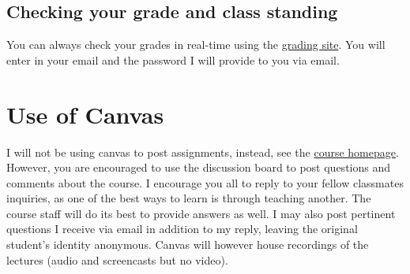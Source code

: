 \documentclass[12pt]{article}
\newcommand{\coursewebpage}{\href{https://github.com/kapelner/Wharton_Stat_422_722}{course homepage}}
\begin{document}
%
%
%
%

\subsection*{Checking your grade and class standing}

You can always check your grades in real-time using the \href{http://wharton.gradesly.com}{grading site}. You will enter in your email and the password I will provide to you via email.

\section*{Use of Canvas}
I will not be using canvas to post assignments, instead, see the \coursewebpage. However, you are encouraged to use the discussion board to post questions and comments about the course. I encourage you all to reply to your fellow classmates inquiries, as one of the best ways to learn is through teaching another. The course staff will do its best to provide answers as well. I may also post pertinent questions I receive via email in addition to my reply, leaving the original student's identity anonymous. Canvas will however house recordings of the lectures (audio and screencasts but no video).
\end{document}
